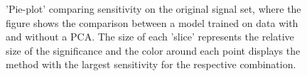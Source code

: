 \begin{figure}[H]
    \caption['Pie-plot' comparing sensitivity on the original signal set, where the figure shows the comparison between a model training on data 
    with and without a \acs{PCA}.]{'Pie-plot' comparing sensitivity on the original signal set, where the figure shows the comparison between a model trained on data 
    with and without a \acs{PCA}. The size of each 'slice' represents the relative size of the significance and the color around each 
    point displays the method with the largest sensitivity for the respective combination.}
    \label{fig:NNPCAComp}
\end{figure}

